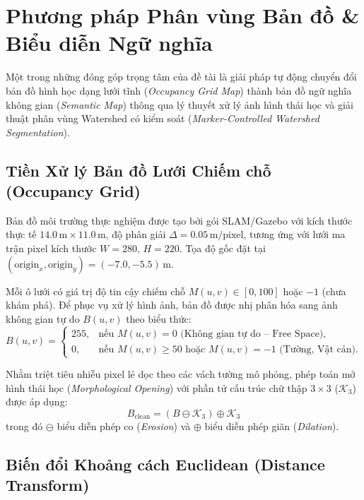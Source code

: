 \section{Phương pháp Phân vùng Bản đồ & Biểu diễn Ngữ nghĩa}
\label{sec:perception}

Một trong những đóng góp trọng tâm của đề tài là giải pháp tự động chuyển đổi bản đồ hình học dạng lưới tĩnh (\textit{Occupancy Grid Map}) thành bản đồ ngữ nghĩa không gian (\textit{Semantic Map}) thông qua lý thuyết xử lý ảnh hình thái học và giải thuật phân vùng Watershed có kiểm soát (\textit{Marker-Controlled Watershed Segmentation}).

\subsection{Tiền Xử lý Bản đồ Lưới Chiếm chỗ (Occupancy Grid)}

Bản đồ môi trường thực nghiệm được tạo bởi gói SLAM/Gazebo với kích thước thực tế $14.0\,\text{m} \times 11.0\,\text{m}$, độ phân giải $\Delta = 0.05\,\text{m/pixel}$, tương ứng với lưới ma trận pixel kích thước $W = 280$, $H = 220$. Tọa độ gốc đặt tại $(\text{origin}_x, \text{origin}_y) = (-7.0, -5.5)\,\text{m}$.

Mỗi ô lưới có giá trị độ tin cậy chiếm chỗ $M(u, v) \in [0, 100]$ hoặc $-1$ (chưa khám phá). Để phục vụ xử lý hình ảnh, bản đồ được nhị phân hóa sang ảnh không gian tự do $B(u, v)$ theo biểu thức:
\begin{equation}
B(u, v) = \begin{cases}
255, & \text{nếu } M(u, v) = 0 \text{ (Không gian tự do -- Free Space)}, \\
0, & \text{nếu } M(u, v) \ge 50 \text{ hoặc } M(u, v) = -1 \text{ (Tường, Vật cản)}.
\end{cases}
\end{equation}

Nhằm triệt tiêu nhiễu pixel lẻ dọc theo các vách tường mô phỏng, phép toán mở hình thái học (\textit{Morphological Opening}) với phần tử cấu trúc chữ thập $3 \times 3$ ($\mathcal{K}_3$) được áp dụng:
\begin{equation}
B_{\text{clean}} = (B \ominus \mathcal{K}_3) \oplus \mathcal{K}_3
\end{equation}
trong đó $\ominus$ biểu diễn phép co (\textit{Erosion}) và $\oplus$ biểu diễn phép giãn (\textit{Dilation}).

\subsection{Biến đổi Khoảng cách Euclidean (Distance Transform)}

